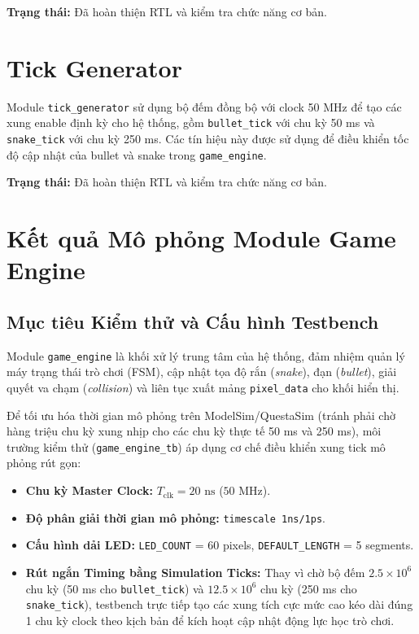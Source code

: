 \documentclass[12pt,a4paper]{article}
\begin{document}
\textbf{Trạng thái:} Đã hoàn thiện RTL và kiểm tra chức năng cơ bản.


\section{Tick Generator}

Module \texttt{tick\_generator} sử dụng bộ đếm đồng bộ với clock 50 MHz để tạo các xung enable định kỳ cho hệ thống, gồm \texttt{bullet\_tick} với chu kỳ 50 ms và \texttt{snake\_tick} với chu kỳ 250 ms. Các tín hiệu này được sử dụng để điều khiển tốc độ cập nhật của bullet và snake trong \texttt{game\_engine}.

\textbf{Trạng thái:} Đã hoàn thiện RTL và kiểm tra chức năng cơ bản.
\newpage

\section{Kết quả Mô phỏng Module Game Engine}

\subsection{Mục tiêu Kiểm thử và Cấu hình Testbench}
Module \texttt{game\_engine} là khối xử lý trung tâm của hệ thống, đảm nhiệm quản lý máy trạng thái trò chơi (FSM), cập nhật tọa độ rắn (\textit{snake}), đạn (\textit{bullet}), giải quyết va chạm (\textit{collision}) và liên tục xuất mảng \texttt{pixel\_data} cho khối hiển thị.

Để tối ưu hóa thời gian mô phỏng trên ModelSim/QuestaSim (tránh phải chờ hàng triệu chu kỳ xung nhịp cho các chu kỳ thực tế 50 ms và 250 ms), môi trường kiểm thử (\texttt{game\_engine\_tb}) áp dụng cơ chế điều khiển xung tick mô phỏng rút gọn:
\begin{itemize}
    \item \textbf{Chu kỳ Master Clock:} $T_{\text{clk}} = 20\text{ ns}$ ($50\text{ MHz}$).
    \item \textbf{Độ phân giải thời gian mô phỏng:} \texttt{timescale 1ns/1ps}.
    \item \textbf{Cấu hình dải LED:} \texttt{LED\_COUNT} = 60 pixels, \texttt{DEFAULT\_LENGTH} = 5 segments.
    \item \textbf{Rút ngắn Timing bằng Simulation Ticks:} Thay vì chờ bộ đếm $2.5\times 10^6$ chu kỳ (50 ms cho \texttt{bullet\_tick}) và $12.5\times 10^6$ chu kỳ (250 ms cho \texttt{snake\_tick}), testbench trực tiếp tạo các xung tích cực mức cao kéo dài đúng 1 chu kỳ clock theo kịch bản để kích hoạt cập nhật động lực học trò chơi.
\end{itemize}
\end{document}
